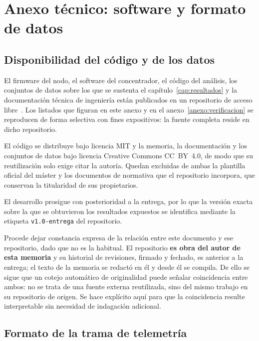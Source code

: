 \chapter{Anexo técnico: software y formato de datos}
\label{anexo:software}

\section{Disponibilidad del código y de los datos}
\label{sec:disponibilidad}

El firmware del nodo, el software del concentrador, el código del análisis, los conjuntos de
datos sobre los que se sustenta el capítulo~\ref{cap:resultados} y la documentación técnica de
ingeniería están publicados en un repositorio de acceso libre~\cite{repotfm}. Los listados que
figuran en este anexo y en el anexo~\ref{anexo:verificacion} se reproducen de forma selectiva
con fines expositivos: la fuente completa reside en dicho repositorio.

El código se distribuye bajo licencia MIT y la memoria, la documentación y los conjuntos de
datos bajo licencia Creative Commons \mbox{CC BY 4.0}, de modo que su reutilización solo exige
citar la autoría. Quedan excluidas de ambas la plantilla oficial del máster y los documentos de
normativa que el repositorio incorpora, que conservan la titularidad de sus propietarios.

El desarrollo prosigue con posterioridad a la entrega, por lo que la versión exacta sobre la que
se obtuvieron los resultados expuestos se identifica mediante la etiqueta
\texttt{v1.0-entrega} del repositorio.

Procede dejar constancia expresa de la relación entre este documento y ese repositorio, dado que
no es la habitual. El repositorio \textbf{es obra del autor de esta memoria} y su historial de
revisiones, firmado y fechado, es anterior a la entrega; el texto de la memoria se redactó en él
y desde él se compila. De ello se sigue que un cotejo automático de originalidad puede señalar
coincidencia entre ambos: no se trata de una fuente externa reutilizada, sino del mismo trabajo
en su repositorio de origen. Se hace explícito aquí para que la coincidencia resulte
interpretable sin necesidad de indagación adicional.

\section{Formato de la trama de telemetría}

